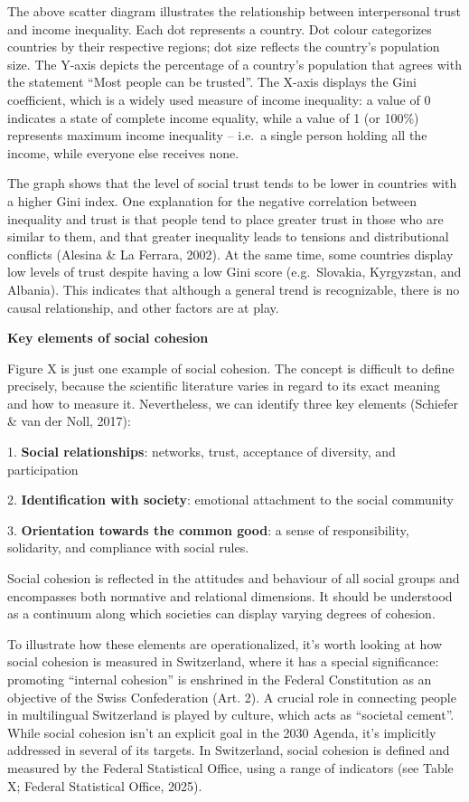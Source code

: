 \documentclass[
  a4paper,
  openany]{book}
\begin{document}
The above scatter diagram illustrates the relationship between
interpersonal trust and income inequality. Each dot represents a
country. Dot colour categorizes countries by their respective regions;
dot size reflects the country's population size. The Y-axis depicts the
percentage of a country's population that agrees with the statement
``Most people can be trusted''. The X-axis displays the Gini
coefficient, which is a widely used measure of income inequality: a
value of 0 indicates a state of complete income equality, while a value
of 1 (or 100\%) represents maximum income inequality -- i.e.~a single
person holding all the income, while everyone else receives none.

The graph shows that the level of social trust tends to be lower in
countries with a higher Gini index. One explanation for the negative
correlation between inequality and trust is that people tend to place
greater trust in those who are similar to them, and that greater
inequality leads to tensions and distributional conflicts (Alesina \& La
Ferrara, 2002). At the same time, some countries display low levels of
trust despite having a low Gini score (e.g.~Slovakia, Kyrgyzstan, and
Albania). This indicates that although a general trend is recognizable,
there is no causal relationship, and other factors are at play.

\textbf{Key elements of social cohesion}

Figure X is just one example of social cohesion. The concept is
difficult to define precisely, because the scientific literature varies
in regard to its exact meaning and how to measure it. Nevertheless, we
can identify three key elements (Schiefer \& van der Noll, 2017):

1. \textbf{Social relationships}: networks, trust, acceptance of
diversity, and participation

2. \textbf{Identification with society}: emotional attachment to the
social community

3. \textbf{Orientation towards the common good}: a sense of
responsibility, solidarity, and compliance with social rules.

Social cohesion is reflected in the attitudes and behaviour of all
social groups and encompasses both normative and relational dimensions.
It should be understood as a continuum along which societies can display
varying degrees of cohesion.

To illustrate how these elements are operationalized, it's worth looking
at how social cohesion is measured in Switzerland, where it has a
special significance: promoting ``internal cohesion'' is enshrined in
the Federal Constitution as an objective of the Swiss Confederation
(Art. 2). A crucial role in connecting people in multilingual
Switzerland is played by culture, which acts as ``societal cement''.
While social cohesion isn't an explicit goal in the 2030 Agenda, it's
implicitly addressed in several of its targets. In Switzerland, social
cohesion is defined and measured by the Federal Statistical Office,
using a range of indicators (see Table X; Federal Statistical Office,
2025).
\end{document}
